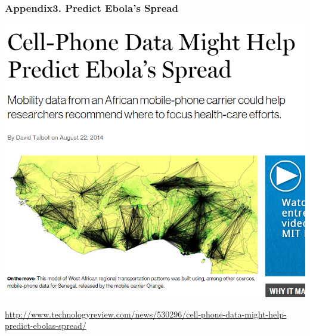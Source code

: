 \documentclass{beamer}
\begin{document}
\begin{frame}[fragile]
\frametitle{Appendix3. Predict Ebola's Spread}
\begin{center}
\includegraphics[scale=0.4]{ebolas.png}
\end{center}
\hfill
\tiny{\href{http://www.technologyreview.com/news/530296/cell-phone-data-might-help-predict-ebolas-spread/}{http://www.technologyreview.com/news/530296/cell-phone-data-might-help-predict-ebolas-spread/}}
\end{frame}
\end{document}
